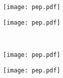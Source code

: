 \documentclass[paper=a4, paper=landscape]{scrartcl}
\begin{document}
%
\begin{minipage}[t][0.49\paperheight][c]{0.5\paperwidth}
  \vspace*{\fill}%
  \centering%
  \texttt{[image: pep.pdf]}%
  \vspace*{\fill}%
\end{minipage}%
\begin{minipage}[t][0.49\paperheight][c]{0.5\paperwidth}
  \vspace*{\fill}%
  \centering%
  \texttt{[image: pep.pdf]}%
  \vspace*{\fill}%
\end{minipage}\\[0pt]
\begin{minipage}[t][0.49\paperheight][c]{0.5\paperwidth}
  \vspace*{\fill}%
  \centering%
  \texttt{[image: pep.pdf]}%
  \vspace*{\fill}%
\end{minipage}%
\begin{minipage}[t][0.49\paperheight][c]{0.5\paperwidth}
  \vspace*{\fill}%
  \centering%
  \texttt{[image: pep.pdf]}%
  \vspace*{\fill}%
\end{minipage}%
\end{document}
